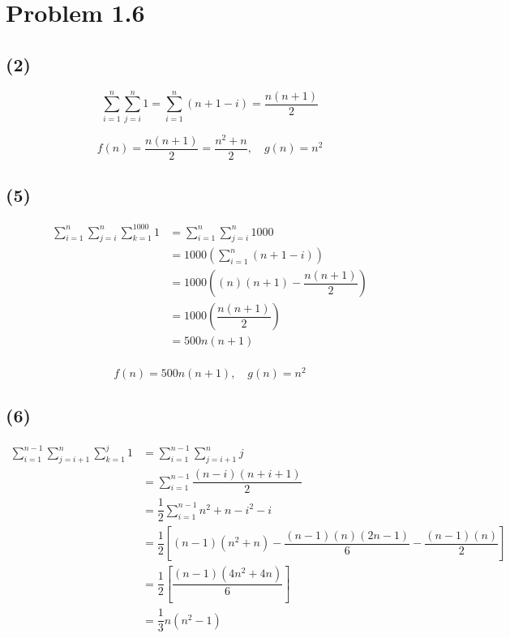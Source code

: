 \documentclass[12pt]{article}
\begin{document}
\section*{Problem 1.6}

\subsection*{(2)}
\[
    \sum_{i = 1}^n \sum_{j = i}^n 1 = \sum_{i = 1}^n (n + 1 - i) = \dfrac{n (n + 1)}{2}
\]

\[ f(n) = \dfrac{n(n + 1)}{2} = \dfrac{n^2 + n}{2}, \quad g(n) = n^2\]

\subsection*{(5)}

\[
  \begin{aligned}
    \sum_{i = 1}^n \sum_{j = i}^n \sum_{k = 1}^{1000} 1 &= \sum_{i = 1}^n \sum_{j = i}^n 1000 \\
    &= 1000 \left(\sum_{i = 1}^n (n + 1 - i) \right) \\
    &= 1000 \left((n)(n + 1) - \dfrac{n (n + 1)}{2} \right) \\
    &= 1000 \left(\dfrac{n (n + 1)}{2} \right) \\
    &= 500n(n + 1) \\
  \end{aligned}
\]

\[f(n) = 500n(n + 1), \quad g(n) = n^2\]

\subsection*{(6)}

\[
  \begin{aligned}
    \sum_{i = 1}^{n-1} \sum_{j = i + 1} ^n \sum_{k = 1} ^j 1 &= \sum_{i = 1}^{n-1} \sum_{j = i + 1} ^n j \\
    &= \sum_{i = 1}^{n-1} \dfrac{(n - i)(n + i + 1)}{2} \\
    &= \dfrac{1}{2}\sum_{i = 1}^{n-1} n^2 + n - i^2 - i \\
    &= \dfrac{1}{2} \left[(n - 1)(n^2 + n) - \dfrac{(n-1)(n)(2n-1)}{6} - \dfrac{(n-1)(n)}{2}\right] \\
    &= \dfrac{1}{2} \left[\dfrac{(n - 1)(4n^2 + 4n)}{6}\right] \\
    &= \dfrac{1}{3} n(n^2 - 1) \\
  \end{aligned}
\]
\end{document}
